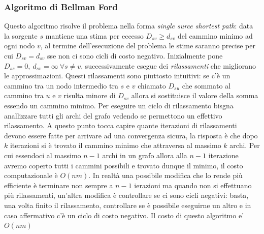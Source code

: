 \documentclass{article}
\begin{document}
\subsubsection{Algoritmo di Bellman Ford}
Questo algoritmo risolve il problema nella forma \textit{single surce shortest path}: data la sorgente $s$ mantiene una stima per eccesso $D_{sv} \geq d_{sv}$ del cammino minimo ad ogni nodo $v$, al termine dell'esecuzione del problema le stime saranno precise per cui $D_{sv} = d_{sv}$ sse non ci sono cicli di costo negativo.
Inizialmente pone $D_{ss} = 0, \   d_{sv} = \infty \ \forall s \not= v$, successivamente esegue dei \textit{rilassamenti} che migliorano le approssimazioni. 
Questi rilassamenti sono piuttosto intuitivi: se c'è un cammino tra un nodo intermedio tra $s$ e $v$ chiamato $D_{su}$ che sommato al cammino tra $u$ e $v$ risulta minore di $D_{sv}$ allora si sostituisce il valore della somma essendo un cammino minimo.
Per eseguire un ciclo di rilassamento bisgna anallizzare tutti gli archi del grafo vedendo se permettono un effettivo rilassamento.
A questo punto tocca capire quante iterazioni di rilassamenti devono essere fatte per arrivare ad una convergenza sicura, la risposta è che dopo $k$ iterazioni si è trovato il cammino minimo che attraversa al massimo $k$ archi.
Per cui essendoci al massimo $n-1$ archi in un grafo allora alla $n-1$ iterazione avremo coperto tutti i cammini possibili e trovato dunque il minimo, il costo computazionale è $O(nm)$.
In realtà una possibile modifica che lo rende più efficiente è terminare non sempre a $n-1$ ierazioni ma quando non si effettuano più rilassamenti, un'altra modifica è controllare se ci sono cicli negativi: basta, una volta finito il rilassamento, controllare se è possibile eseguirne un altro e in caso affermativo c'è un ciclo di costo negativo.
Il costo di questo algoritmo e' $O(nm)$
\end{document}
